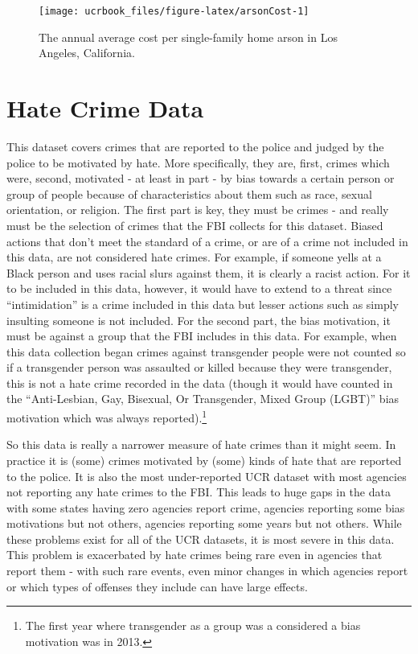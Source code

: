 \documentclass[
  12pt,
  openany]{book}
\begin{document}
\begin{figure}

{\centering \texttt{[image: ucrbook\_files/figure-latex/arsonCost-1]} 

}

\caption{The annual average cost per single-family home arson in Los Angeles, California.}\label{fig:arsonCost}
\end{figure}

\hypertarget{hate_crimes}{%
\chapter{Hate Crime Data}\label{hate_crimes}}

This dataset covers crimes that are reported to the police and judged by the police to be motivated by hate. More specifically, they are, first, crimes which were, second, motivated - at least in part - by bias towards a certain person or group of people because of characteristics about them such as race, sexual orientation, or religion. The first part is key, they must be crimes - and really must be the selection of crimes that the FBI collects for this dataset. Biased actions that don't meet the standard of a crime, or are of a crime not included in this data, are not considered hate crimes. For example, if someone yells at a Black person and uses racial slurs against them, it is clearly a racist action. For it to be included in this data, however, it would have to extend to a threat since ``intimidation'' is a crime included in this data but lesser actions such as simply insulting someone is not included. For the second part, the bias motivation, it must be against a group that the FBI includes in this data. For example, when this data collection began crimes against transgender people were not counted so if a transgender person was assaulted or killed because they were transgender, this is not a hate crime recorded in the data (though it would have counted in the ``Anti-Lesbian, Gay, Bisexual, Or Transgender, Mixed Group (LGBT)'' bias motivation which was always reported).\footnote{The first year where transgender as a group was a considered a bias motivation was in 2013.}

So this data is really a narrower measure of hate crimes than it might seem. In practice it is (some) crimes motivated by (some) kinds of hate that are reported to the police. It is also the most under-reported UCR dataset with most agencies not reporting any hate crimes to the FBI. This leads to huge gaps in the data with some states having zero agencies report crime, agencies reporting some bias motivations but not others, agencies reporting some years but not others. While these problems exist for all of the UCR datasets, it is most severe in this data. This problem is exacerbated by hate crimes being rare even in agencies that report them - with such rare events, even minor changes in which agencies report or which types of offenses they include can have large effects.
\end{document}
